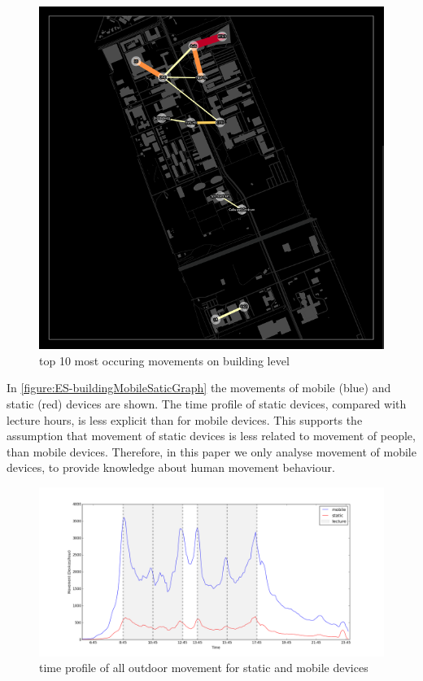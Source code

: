 \begin{figure}[H]
\centering
\includegraphics[scale=0.1]{ES-mapTotal.png}
\captionsetup{justification=centering}
\caption{top 10 most occuring movements on building level}
\label{figure:ES-mapTotal}
\end{figure}

In \autoref{figure:ES-buildingMobileSaticGraph} the movements of mobile (blue) and static (red) devices are shown. The time profile of static devices, compared with lecture hours, is less explicit than for mobile devices. This supports the assumption that movement of static devices is less related to movement of people, than mobile devices. Therefore, in this paper we only analyse movement of mobile devices, to provide knowledge about human movement behaviour.

\begin{figure}[H]
\centering
\includegraphics[scale=0.2]{building_mobileStatic_graph.png}
\captionsetup{justification=centering}
\caption{time profile of all outdoor movement for static and mobile devices}
\label{figure:ES-buildingMobileSaticGraph}
\end{figure}

